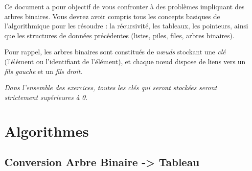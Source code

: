 \documentclass[11pt,a4paper]{article}
\begin{document}
\EncadreTitre

\bigskip


%
%

\bigskip


Ce document a pour objectif de vous confronter à des problèmes impliquant des arbres binaires.
Vous devrez avoir compris tous les concepts basiques de l'algorithmique pour les résoudre : la récursivité, les tableaux, les pointeurs, ainsi que les structures de données précédentes (listes, piles, files, arbres binaires).

\bigskip

Pour rappel, les arbres binaires sont constitués de \textit{nœuds} stockant une \textit{clé} (l'élément ou l'identifiant de l'élément), et chaque nœud dispose de liens vers un \textit{fils gauche} et un \textit{fils droit}.

\medskip

\textit{Dans l'ensemble des exercices, toutes les clés qui seront stockées seront strictement supérieures à 0.}

\bigskip


\section*{Algorithmes}

\subsection*{Conversion Arbre Binaire -> Tableau}
\end{document}

